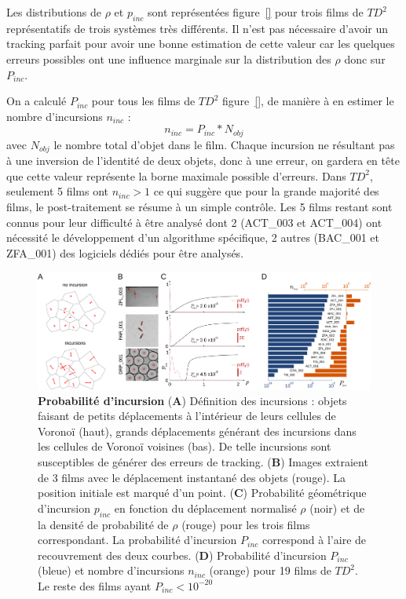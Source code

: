 	
	Les distributions de $\rho$ et $p_{inc}$ sont représentées figure~\ref{} pour trois films de $TD^2$ représentatifs de trois systèmes très différents. Il n'est pas nécessaire d'avoir un tracking parfait pour avoir une bonne estimation de cette valeur car les quelques erreurs possibles ont une influence marginale sur la distribution des $\rho$ donc sur $P_{inc}$.

	On a calculé $P_{inc}$ pour tous les films de $TD^2$ figure~\ref{}, de manière à en estimer le nombre d'incursions $n_{inc}$ :
	$$
	    n_{inc}=P_{inc}*N_{obj}
	$$
	avec $N_{obj}$ le nombre total d'objet dans le film.
	Chaque incursion ne résultant pas à une inversion de l'identité de deux objets, donc à une erreur, on gardera en tête que cette valeur représente la borne maximale possible d'erreurs. Dans $TD^2$, seulement 5 films ont $n_{inc}>1$ ce qui suggère que pour la grande majorité des films, le post-traitement se résume à un simple contrôle. Les 5 films restant sont connus pour leur difficulté à être analysé dont 2 (ACT\_003 et ACT\_004) ont nécessité le développement d'un algorithme spécifique, 2 autres (BAC\_001 et ZFA\_001) des logiciels dédiés pour être analysés.
	
	\begin{figure}[h]
    \centering
    \includegraphics[width=1\textwidth]{part_1/assets/Figure_3.png}    
    \caption{\textbf{Probabilité d'incursion} (\textbf{A}) Définition des incursions : objets faisant de petits déplacements à l'intérieur de leurs cellules de Voronoï (haut), grands déplacements générant des incursions dans les cellules de Voronoï voisines (bas). De telle incursions sont susceptibles de générer des erreurs de tracking. (\textbf{B}) Images extraient de 3 films avec le déplacement instantané des objets (rouge). La position initiale est marqué d'un point. (\textbf{C}) Probabilité géométrique d'incursion $p_{inc}$ en fonction du déplacement normalisé $\rho$ (noir) et de la densité de probabilité de $\rho$ (rouge) pour les trois films correspondant. La probabilité d'incursion $P_{inc}$ correspond à l'aire de recouvrement des deux courbes. (\textbf{D}) Probabilité d'incursion $P_{inc}$ (bleue) et nombre d'incursions $n_{inc}$ (orange) pour 19 films de $TD^2$. Le reste des films ayant $P_{inc}<10^{-20}$}
    \label{part_1:fig_3}
    \end{figure}
	
